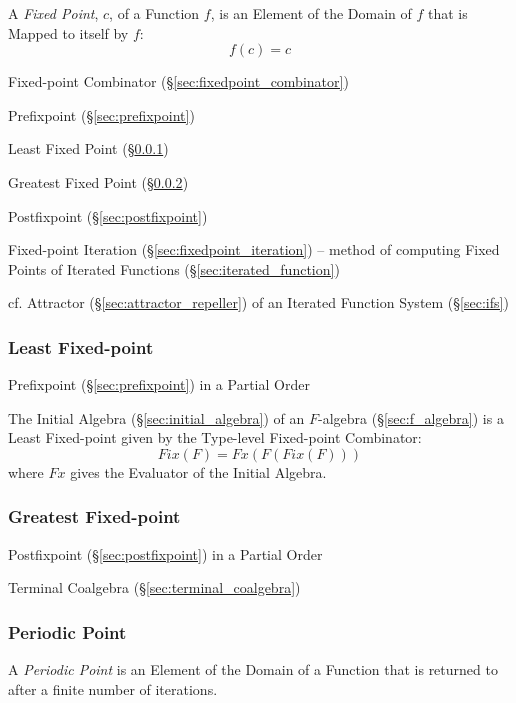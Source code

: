 A \emph{Fixed Point}, $c$, of a Function $f$, is an Element of the Domain of $f$
that is Mapped to itself by $f$:
\[
  f(c) = c
\]

Fixed-point Combinator (\S\ref{sec:fixedpoint_combinator})

Prefixpoint (\S\ref{sec:prefixpoint})

Least Fixed Point (\S\ref{sec:least_fixedpoint})

Greatest Fixed Point (\S\ref{sec:greatest_fixedpoint})

Postfixpoint (\S\ref{sec:postfixpoint})

\fist Fixed-point Iteration (\S\ref{sec:fixedpoint_iteration}) -- method of
computing Fixed Points of Iterated Functions (\S\ref{sec:iterated_function})

cf. Attractor (\S\ref{sec:attractor_repeller}) of an Iterated Function System
(\S\ref{sec:ifs})



\subsubsection{Least Fixed-point}\label{sec:least_fixedpoint}

Prefixpoint (\S\ref{sec:prefixpoint}) in a Partial Order

The Initial Algebra (\S\ref{sec:initial_algebra}) of an $F$-algebra
(\S\ref{sec:f_algebra}) is a Least Fixed-point given by the Type-level
Fixed-point Combinator:
\[
  Fix (F) = Fx(F (Fix (F)))
\]
where $Fx$ gives the Evaluator of the Initial Algebra.



\subsubsection{Greatest Fixed-point}\label{sec:greatest_fixedpoint}

Postfixpoint (\S\ref{sec:postfixpoint}) in a Partial Order

Terminal Coalgebra (\S\ref{sec:terminal_coalgebra})



\subsubsection{Periodic Point}\label{sec:periodic_point}

A \emph{Periodic Point} is an Element of the Domain of a Function that
is returned to after a finite number of iterations.




